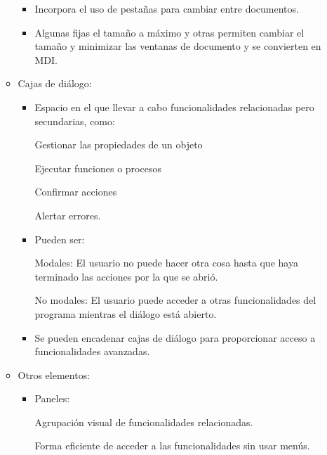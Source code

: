 \documentclass[12pt, twoside, openright]{report} %
\begin{document}
\begin{itemize}
\begin{itemize}
\begin{itemize}
			            \item Incorpora el uso de pestañas para cambiar entre
			                  documentos.

			            \item Algunas fijas el tamaño a máximo y otras permiten cambiar
			                  el tamaño y minimizar las ventanas de documento y se
			                  convierten en MDI.
		            \end{itemize}

		      \item Cajas de diálogo:

		            \begin{itemize}
			            \item Espacio en el que llevar a cabo funcionalidades
			                  relacionadas pero secundarias, como:

			                  Gestionar las propiedades de un objeto

			                  Ejecutar funciones o procesos

			                  Confirmar acciones

			                  Alertar errores.


			            \item Pueden ser:

			                  Modales: El usuario no puede hacer otra cosa hasta que
			                  haya terminado las acciones por la que se abrió.

			                  No modales: El usuario puede acceder a otras
			                  funcionalidades del programa mientras el diálogo está
			                  abierto.


			            \item Se pueden encadenar cajas de diálogo para proporcionar
			                  acceso a funcionalidades avanzadas.
		            \end{itemize}

		      \item Otros elementos:

		            \begin{itemize}
			            \item Paneles:

			                  Agrupación visual de funcionalidades relacionadas.

			                  Forma eficiente de acceder a las funcionalidades sin
			                  usar menús.



\end{itemize}
\end{itemize}
\end{itemize}
\end{document}
